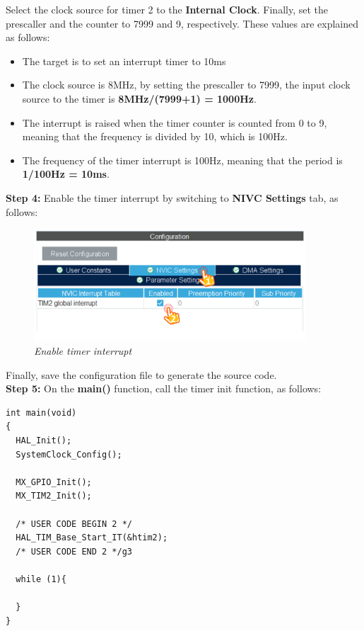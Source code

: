 Select the clock source for timer 2 to the \textbf{Internal Clock}. Finally, set the prescaller and the counter to 7999 and 9, respectively. These values are explained as follows:
\begin{itemize}
    \item The target is to set an interrupt timer to 10ms
    \item The clock source is 8MHz, by setting the prescaller to 7999, the input clock source to the timer is \textbf{8MHz/(7999+1) = 1000Hz}.
    \item The interrupt is raised when the timer counter is counted from 0 to 9, meaning that the frequency is divided by 10, which is 100Hz.
    \item The frequency of the timer interrupt is 100Hz, meaning that the period is \textbf{1/100Hz = 10ms}.
\end{itemize}

\textbf{Step 4: } Enable the timer interrupt by switching to \textbf{NIVC Settings} tab, as follows:

\begin{figure}[!htp]
    \centering
    \includegraphics[width=4in]{source/picture/bai_2/lab2_m3.PNG}
    \caption{\textit{Enable timer interrupt}}
    \label{bai2_m3}
\end{figure}

Finally, save the configuration file to generate the source code.\\

\textbf{Step 5: } On the \textbf{main()} function, call the timer init function, as follows:

\begin{lstlisting}[caption=Init the timer interrupt in main]
int main(void)
{
  HAL_Init();
  SystemClock_Config();

  MX_GPIO_Init();
  MX_TIM2_Init();
  
  /* USER CODE BEGIN 2 */
  HAL_TIM_Base_Start_IT(&htim2);
  /* USER CODE END 2 */g3

  while (1){
  
  }
}
\end{lstlisting}

